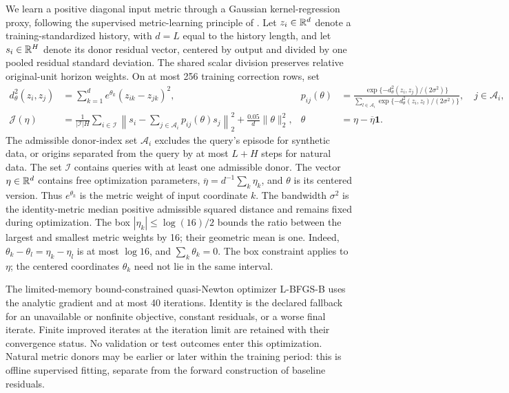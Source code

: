 We learn a positive diagonal input metric through a Gaussian
kernel-regression proxy, following the supervised metric-learning
principle of \citet{Weinberger2007Metric}. Let $z_i\in\mathbb{R}^d$ denote a training-standardized history, with
$d=L$ equal to the history length, and let $s_i\in\mathbb{R}^H$ denote its donor residual vector,
centered by output and divided by one pooled residual standard deviation.
The shared scalar division preserves relative original-unit horizon
weights. On at most 256 training correction rows, set
\begin{align}
 d_\theta^2(z_i,z_j)&=\sum_{k=1}^{d}e^{\theta_k}(z_{ik}-z_{jk})^2,
 &p_{ij}(\theta)&=
 \frac{\exp\{-d_\theta^2(z_i,z_j)/(2\sigma^2)\}}
      {\sum_{l\in\mathcal A_i}\exp\{-d_\theta^2(z_i,z_l)/(2\sigma^2)\}},
 \quad j\in\mathcal A_i,\label{eq:target-metric-weights}\\
 \mathcal J(\eta)&=
 \frac{1}{|\mathcal I|H}\sum_{i\in\mathcal I}
 \left\|s_i-\sum_{j\in\mathcal A_i}p_{ij}(\theta)s_j\right\|_2^2
 +\frac{0.05}{d}\|\theta\|_2^2,
 &\theta&=\eta-\overline\eta\mathbf1.
 \label{eq:target-metric-objective}
\end{align}
The admissible donor-index set $\mathcal A_i$ excludes the query's episode for synthetic
data, or origins separated from the query by at most $L+H$ steps for natural
data. The set $\mathcal I$ contains queries with at least one admissible
donor. The vector $\eta\in\mathbb{R}^d$ contains free optimization parameters,
$\overline\eta=d^{-1}\sum_k\eta_k$, and $\theta$ is its centered
version. Thus $e^{\theta_k}$ is the metric weight of input coordinate $k$. The bandwidth $\sigma^2$ is the identity-metric
median positive admissible squared distance and remains fixed during
optimization. The box $|\eta_k|\leq\log(16)/2$ bounds the ratio between
the largest and smallest metric weights by 16; their geometric mean is
one. Indeed, $\theta_k-\theta_l=\eta_k-\eta_l$ is at most
$\log16$, and $\sum_k\theta_k=0$. The box constraint applies
to $\eta$; the centered coordinates $\theta_k$ need not lie in
the same interval.

The limited-memory bound-constrained quasi-Newton optimizer L-BFGS-B
uses the analytic gradient and at most 40 iterations.
Identity is the declared fallback for an unavailable or nonfinite
objective, constant residuals, or a worse final iterate. Finite improved
iterates at the iteration limit are retained with their convergence
status. No validation or test outcomes enter this optimization. Natural
metric donors may be earlier or later within the training period: this
is offline supervised fitting, separate from the forward construction
of baseline residuals.

